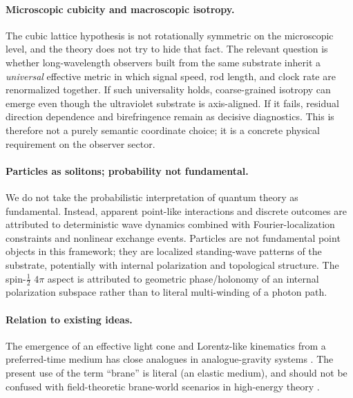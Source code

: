 \paragraph{Microscopic cubicity and macroscopic isotropy.}
The cubic lattice hypothesis is not rotationally symmetric on the microscopic level, and the theory does not try to hide
that fact.
The relevant question is whether long-wavelength observers built from the same substrate inherit a \emph{universal}
effective metric in which signal speed, rod length, and clock rate are renormalized together.
If such universality holds, coarse-grained isotropy can emerge even though the ultraviolet substrate is axis-aligned.
If it fails, residual direction dependence and birefringence remain as decisive diagnostics.
This is therefore not a purely semantic coordinate choice; it is a concrete physical requirement on the observer sector.

\paragraph{Particles as solitons; probability not fundamental.}
We do not take the probabilistic interpretation of quantum theory as fundamental.
Instead, apparent point-like interactions and discrete outcomes are attributed to deterministic wave dynamics
combined with Fourier-localization constraints and nonlinear exchange events.
Particles are not fundamental point objects in this framework; they are localized standing-wave patterns of the
substrate, potentially with internal polarization and topological structure.
The spin-$\tfrac12$ $4\pi$ aspect is attributed to geometric phase/holonomy of an internal polarization
subspace rather than to literal multi-winding of a photon path.

\paragraph{Relation to existing ideas.}
The emergence of an effective light cone and Lorentz-like kinematics from a preferred-time medium has
close analogues in analogue-gravity systems \citep{Barcelo2011AnalogueGravity,Volovik2003HeliumDroplet,Jacobson2004EinsteinAether}.
The present use of the term ``brane'' is literal (an elastic medium), and should not be confused with
field-theoretic brane-world scenarios in high-energy theory \citep{RandallSundrum1999}.

